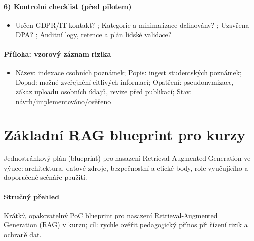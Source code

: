 \documentclass{report}%
\begin{document}
\paragraph{6) Kontrolní checklist (před pilotem)}\begin{itemize}
\item Určen GDPR/IT kontakt? \underline{\hspace{4cm}}; Kategorie a minimalizace definovány? \underline{\hspace{2cm}}; Uzavřena DPA? \underline{\hspace{2cm}}; Auditní logy, retence a plán lidské validace? \underline{\hspace{2cm}}
\end{itemize}
\paragraph{Příloha: vzorový záznam rizika}\begin{itemize}
\item Název: indexace osobních poznámek; Popis: ingest studentských poznámek; Dopad: možné zveřejnění citlivých informací; Opatření: pseudonymizace, zákaz uploadu osobních údajů, revize před publikací; Stav: návrh/implementováno/ověřeno
\end{itemize}%

%
\section{Základní RAG blueprint pro kurzy}%
Jednostránkový plán (blueprint) pro nasazení Retrieval-Augmented Generation ve výuce: architektura, datové zdroje, bezpečnostní a etické body, role vyučujícího a doporučené scénáře použití.%


%
\paragraph{Stručný přehled} Krátký, opakovatelný PoC blueprint pro nasazení Retrieval‑Augmented Generation (RAG) v kurzu; cíl: rychle ověřit pedagogický přínos při řízení rizik a ochraně dat.
\end{document}
